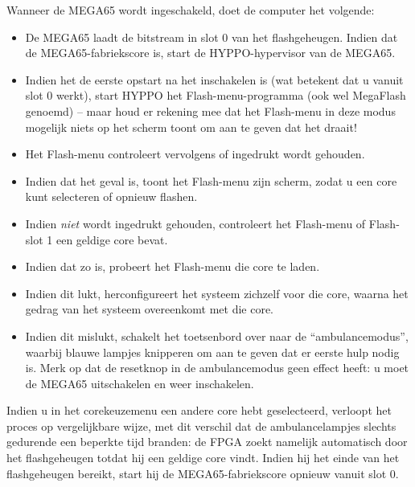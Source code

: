 Wanneer de MEGA65 wordt ingeschakeld, doet de computer het volgende:
\begin{itemize}
\item De MEGA65 laadt de bitstream in slot 0 van het flashgeheugen. Indien dat de MEGA65-fabriekscore is, start de HYPPO-hypervisor van de MEGA65.\item Indien het de eerste opstart na het inschakelen is (wat betekent dat u vanuit slot 0 werkt), start HYPPO het Flash-menu-programma (ook wel MegaFlash genoemd) -- maar houd er rekening mee dat het Flash-menu in deze modus mogelijk niets op het scherm toont om aan te geven dat het draait!\item Het Flash-menu controleert vervolgens of  ingedrukt wordt gehouden.\item Indien dat het geval is, toont het Flash-menu zijn scherm, zodat u een core kunt selecteren of opnieuw flashen.\item Indien  {\em niet} wordt ingedrukt gehouden, controleert het Flash-menu of Flash-slot 1 een geldige core bevat.\item Indien dat zo is, probeert het Flash-menu die core te laden.\item Indien dit lukt, herconfigureert het systeem zichzelf voor die core, waarna het gedrag van het systeem overeenkomt met die core.\item Indien dit mislukt, schakelt het toetsenbord over naar de ``ambulancemodus'', waarbij blauwe lampjes knipperen om aan te geven dat er eerste hulp nodig is. Merk op dat de resetknop in de ambulancemodus geen effect heeft: u moet de MEGA65 uitschakelen en weer inschakelen.
\end{itemize}

Indien u in het corekeuzemenu een andere core hebt geselecteerd, verloopt het proces op vergelijkbare wijze, met dit verschil dat de ambulancelampjes slechts gedurende een beperkte tijd branden: de FPGA zoekt namelijk automatisch door het flashgeheugen totdat hij een geldige core vindt. Indien hij het einde van het flashgeheugen bereikt, start hij de MEGA65-fabriekscore opnieuw vanuit slot 0.
